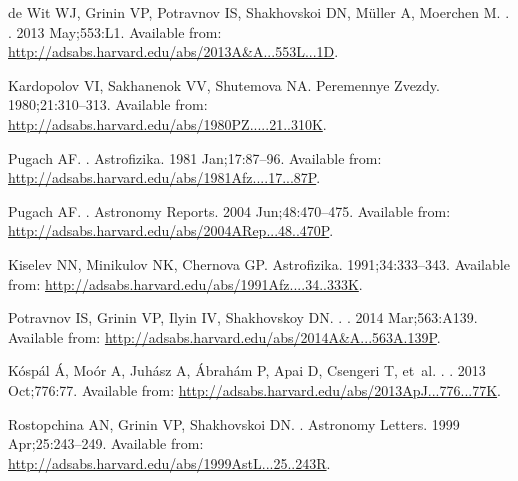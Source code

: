 \documentclass[]{rsos}
\begin{document}
\begin{thebibliography}{10}
{de Wit} WJ, {Grinin} VP, {Potravnov} IS, {Shakhovskoi} DN, {M{\"u}ller} A,
  {Moerchen} M.
.
\newblock \aap. 2013 May;553:L1.
\newblock Available from:
  \url{http://adsabs.harvard.edu/abs/2013A&A...553L...1D}.

{Kardopolov} VI, {Sakhanenok} VV, {Shutemova} NA.
\newblock Peremennye Zvezdy. 1980;21:310--313.
\newblock Available from:
  \url{http://adsabs.harvard.edu/abs/1980PZ.....21..310K}.

{Pugach} AF.
.
\newblock Astrofizika. 1981 Jan;17:87--96.
\newblock Available from:
  \url{http://adsabs.harvard.edu/abs/1981Afz....17...87P}.

{Pugach} AF.
.
\newblock Astronomy Reports. 2004 Jun;48:470--475.
\newblock Available from:
  \url{http://adsabs.harvard.edu/abs/2004ARep...48..470P}.

{Kiselev} NN, {Minikulov} NK, {Chernova} GP.
\newblock Astrofizika. 1991;34:333--343.
\newblock Available from:
  \url{http://adsabs.harvard.edu/abs/1991Afz....34..333K}.

{Potravnov} IS, {Grinin} VP, {Ilyin} IV, {Shakhovskoy} DN.
.
\newblock \aap. 2014 Mar;563:A139.
\newblock Available from:
  \url{http://adsabs.harvard.edu/abs/2014A&A...563A.139P}.

{K{\'o}sp{\'a}l} {\'A}, {Mo{\'o}r} A, {Juh{\'a}sz} A, {{\'A}brah{\'a}m} P,
  {Apai} D, {Csengeri} T, et~al.
.
\newblock \apj. 2013 Oct;776:77.
\newblock Available from:
  \url{http://adsabs.harvard.edu/abs/2013ApJ...776...77K}.

{Rostopchina} AN, {Grinin} VP, {Shakhovskoi} DN.
.
\newblock Astronomy Letters. 1999 Apr;25:243--249.
\newblock Available from:
  \url{http://adsabs.harvard.edu/abs/1999AstL...25..243R}.


\end{thebibliography}
\end{document}
